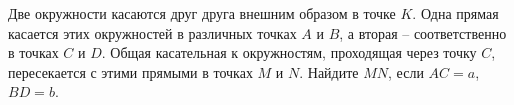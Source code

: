 \begin{ex}
	\begin{condition}
		Две окружности касаются друг друга внешним образом в точке \( K \). Одна прямая касается этих окружностей в	различных точках \( A  \) и \( B \), а вторая – соответственно в точках \( C  \) и \( D \). Общая касательная к окружностям, проходящая через точку \( C \), пересекается с этими прямыми в точках \( M  \) и \( N \). Найдите \( MN \), если \( AC = a \), \( BD = b \).
	\end{condition}
\end{ex}